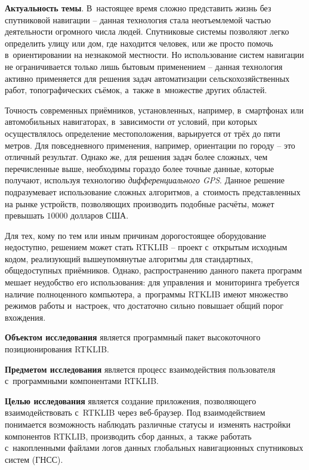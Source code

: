 
\textbf{Актуальность темы}. В~настоящее время сложно представить жизнь без спутниковой навигации -- данная технология стала неотъемлемой частью деятельности огромного числа людей. Спутниковые системы позволяют легко определить улицу или дом, где находится человек, или же просто помочь в~ориентировании на незнакомой местности. Но использование систем навигации не ограничивается только лишь бытовым применением -- данная технология активно применяется для решения задач автоматизации сельскохозяйственных работ, топографических съёмок, а~также в~множестве других областей. \par

Точность современных приёмников, установленных, например, в~смартфонах или автомобильных навигаторах, в~зависимости от условий, при которых осуществлялось определение местоположения, варьируется от трёх до пяти метров. Для повседневного применения, например, ориентации по городу -- это отличный результат. Однако же, для решения задач более сложных, чем перечисленные выше, необходимы гораздо более точные данные, которые получают, используя технологию \textit{дифференциального GPS}. Данное решение подразумевает использование сложных алгоритмов, а~стоимость представленных на рынке устройств, позволяющих производить подобные расчёты, может превышать $10000$ долларов США. \par

Для тех, кому по тем или иным причинам дорогостоящее оборудование недоступно, решением может стать RTKLIB \cite{RTKLIB} -- проект с~открытым исходным кодом, реализующий вышеупомянутые алгоритмы для стандартных, общедоступных приёмников. Однако, распространению данного пакета программ мешает неудобство его использования: для управления и~мониторинга требуется наличие полноценного компьютера, а~программы RTKLIB имеют множество режимов работы и~настроек, что достаточно сильно повышает общий порог вхождения. \par

\textbf{Объектом исследования} является программный пакет высокоточного позиционирования RTKLIB. \par

\textbf{Предметом исследования} является процесс взаимодействия пользователя с~программными компонентами RTKLIB. \par

\textbf{Целью исследования} является создание приложения, позволяющего взаимодействовать с~RTKLIB через веб-браузер. Под взаимодействием понимается возможность наблюдать различные статусы и~изменять настройки компонентов RTKLIB, производить сбор данных, а~также работать с~накопленными файлами логов данных глобальных навигационных спутниковых систем (ГНСС). \par


